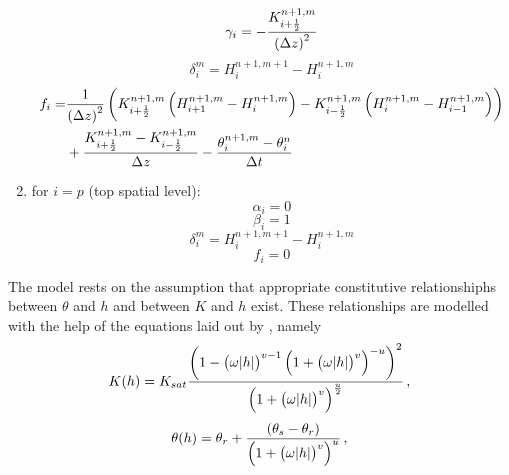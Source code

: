 \begin{enumerate}
\begin{equation}
  \end{equation}
  \begin{equation}
    \label{eq:gamma_intermediate}
    \gamma_i = - \frac{K_{i+\frac{1}{2}}^{n+1,m}}{\del{ \Delta z }^2}
  \end{equation}
  \begin{equation}
    \label{eq:delta_intermediate}
    \delta_i^m = H_i^{n+1,m+1} - H_i^{n+1,m}
  \end{equation}
  \begin{equation}
    \label{eq:f_intermediate}
    \begin{split}
      f_i = &\frac{1}{\del{ \Delta z }^2} \del{ K_{i+\frac{1}{2}}^{n+1,m} \del{ H_{i+1}^{n+1,m} - H_{i}^{n+1,m} } - K_{i-\frac{1}{2}}^{n+1,m} \del{ H_{i}^{n+1,m} - H_{i-1}^{n+1,m} } } \\
      &+ \frac{K_{i+\frac{1}{2}}^{n+1,m} - K_{i-\frac{1}{2}}^{n+1,m}}{\Delta z} - \frac{\theta_i^{n+1,m} - \theta_i^{n}}{\Delta t}
    \end{split}
  \end{equation}
\item for $i = p$ (top spatial level):
  \begin{equation}
    \label{eq:alpha_top}
    \alpha_i = 0
  \end{equation}
  \begin{equation}
    \label{eq:beta_top}
    \beta_i = 1
  \end{equation}
  \begin{equation}
    \label{eq:delta_top}
    \delta_i^m = H_i^{n+1,m+1} - H_i^{n+1,m}
  \end{equation}
  \begin{equation}
    \label{eq:f_top}
    f_i = 0
  \end{equation}
\end{enumerate}
The model rests on the assumption that appropriate constitutive relationshiphs between $\theta$ and $h$ and between $K$ and $h$ exist.  These relationships are modelled with the help of the equations laid out by \textcite{genuchten_closed-form_1980}, namely
\begin{equation}
  \label{eq:vange_K}
  K(h) = K_{sat} \frac{\del{ 1 - \del{ \omega \abs{h} }^{v-1} \del{ 1 + \del{ \omega \abs{h} }^v }^{-u} }^2}{\del{ 1 + \del{ \omega \abs{h} }^v }^{\frac{u}{2}}} \, ,
\end{equation}
\begin{equation}
  \label{eq:vange_theta}
  \theta(h) = \theta_r + \frac{\del{ \theta_s - \theta_r}}{\del{ 1 + \del{ \omega \abs{h} }^v }^u} \, ,
\end{equation}
